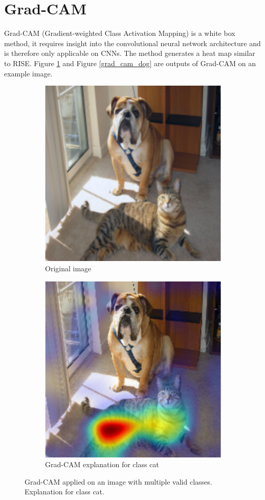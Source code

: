 \section{Grad-CAM}
Grad-CAM\cite{selvaraju2017grad} (Gradient-weighted Class Activation Mapping) is a white box method, it requires insight into the convolutional neural network architecture and is therefore only applicable on CNNs. The method generates a heat map similar to RISE. Figure \ref{grad_cam_cat} and Figure \ref{grad_cam_dog} are outputs of Grad-CAM on an example image.

\begin{figure}[H]
    \centering
    \begin{subfigure}{.5\textwidth}
        \centering
        \includegraphics[width=0.7\linewidth]{chapters/02_methods/images/grad-cam-original.png}
        \caption{Original image}
    \end{subfigure}\hfill%
    \begin{subfigure}{.5\textwidth}
        \centering
        \includegraphics[width=0.7\linewidth]{chapters/02_methods/images/grad-cam-cat.png}
        \caption{Grad-CAM explanation for class cat}
    \end{subfigure}
    \caption{Grad-CAM applied on an image with multiple valid classes. Explanation for class cat.}
    \label{grad_cam_cat}
\end{figure}

